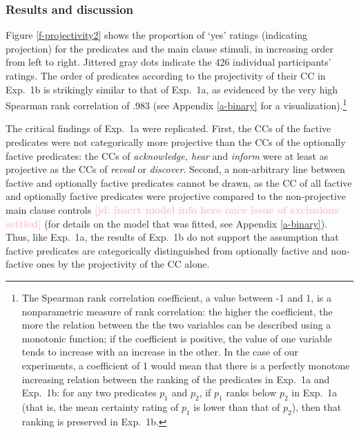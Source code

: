 \documentclass[11pt,fleqn]{article}
\newcommand{\jd}[1]{\textbf{\textcolor{Pink}{[jd: #1]}}}
\newcommand{\6}{\mbox{$[\hspace*{-.6mm}[$}}
\newcommand{\9}{\mbox{$]\hspace*{-.6mm}]$}}
\begin{document}
\subsubsection{Results and discussion}

Figure \ref{f-projectivity2} shows the proportion of `yes' ratings (indicating projection) for the predicates and the main clause stimuli, in increasing order from left to right. Jittered gray dots indicate the 426 individual participants' ratings. The order of predicates according to the projectivity of their CC in Exp.~1b is strikingly similar to that of Exp.~1a, as evidenced by the very high Spearman rank correlation of .983 (see Appendix \ref{a-binary} for a visualization).\footnote{The Spearman rank correlation coefficient, a value between -1 and 1, is a nonparametric measure of rank correlation: the higher the coefficient, the more the relation between the the two variables can be described using a monotonic function; if the coefficient is positive, the value of one variable tends to increase with an increase in the other. In the case of our experiments, a coefficient of 1 would mean that there is a perfectly monotone increasing relation between the ranking of the predicates in Exp.~1a and Exp.~1b: for any two predicates $p_1$ and $p_2$, if $p_1$ ranks below $p_2$ in Exp.~1a (that is, the mean certainty rating of $p_1$ is lower than that of $p_2$), then that ranking is preserved in Exp.~1b.} 

The critical findings of Exp.~1a were replicated. First, the CCs of the factive predicates were not categorically more projective than the CCs of the optionally factive predicates:  the CCs of {\em acknowledge, hear} and {\em inform} were at least as projective as the CCs of {\em reveal} or {\em discover}. Second, a non-arbitrary line between factive and optionally factive predicates cannot be drawn, as the CC of all factive and optionally factive predicates were projective compared to the non-projective main clause controls \jd{insert model info here once issue of exclusions settled} (for details on the model that was fitted, see Appendix \ref{a-binary}). Thus, like Exp.~1a, the results of Exp.~1b do not support the assumption that factive predicates are categorically distinguished from optionally factive and non-factive ones by the projectivity of the CC alone. 
\end{document}
